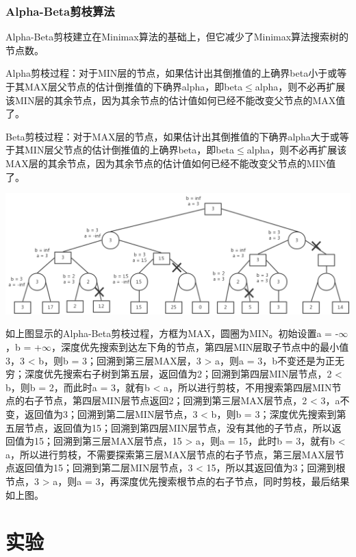 \documentclass{article}
\begin{document}
\subsubsection{Alpha-Beta剪枝算法\cite{r2}}
Alpha-Beta剪枝建立在Minimax算法的基础上，但它减少了Minimax算法搜索树的节点数。
\par
Alpha剪枝过程：对于MIN层的节点，如果估计出其倒推值的上确界beta小于或等于其MAX层父节点的估计倒推值的下确界alpha，即beta$\leq$alpha，则不必再扩展该MIN层的其余节点，因为其余节点的估计值如何已经不能改变父节点的MAX值了。
\par
Beta剪枝过程：对于MAX层的节点，如果估计出其倒推值的下确界alpha大于或等于其MIN层父节点的估计倒推值的上确界beta，即beta$\leq$alpha，则不必再扩展该MAX层的其余节点，因为其余节点的估计值如何已经不能改变父节点的MIN值了。
\begin{center}
    \includegraphics[scale=0.4]{2.PNG}
\end{center}
\par
如上图显示的Alpha-Beta剪枝过程，方框为MAX，圆圈为MIN。初始设置a = -$\infty$，b = +$\infty$，深度优先搜索到达左下角的节点，第四层MIN层取子节点中的最小值3，3 < b，则b = 3；回溯到第三层MAX层，3 > a，则a = 3，b不变还是为正无穷；深度优先搜索右子树到第五层，返回值为2；回溯到第四层MIN层节点，2 < b，则b = 2，而此时a = 3，就有b < a，所以进行剪枝，不用搜索第四层MIN节点的右子节点，第四层MIN层节点返回2；回溯到第三层MAX层节点，2 < 3，a不变，返回值为3；回溯到第二层MIN层节点，3 < b，则b = 3；深度优先搜索到第五层节点，返回值为15；回溯到第四层MIN层节点，没有其他的子节点，所以返回值为15；回溯到第三层MAX层节点，15 > a，则a = 15，此时b = 3，就有b < a，所以进行剪枝，不需要探索第三层MAX层节点的右子节点，第三层MAX层节点返回值为15；回溯到第二层MIN层节点，3 < 15，所以其返回值为3；回溯到根节点，3 > a，则a = 3，再深度优先搜索根节点的右子节点，同时剪枝，最后结果如上图。

\section{实验}
\end{document}
